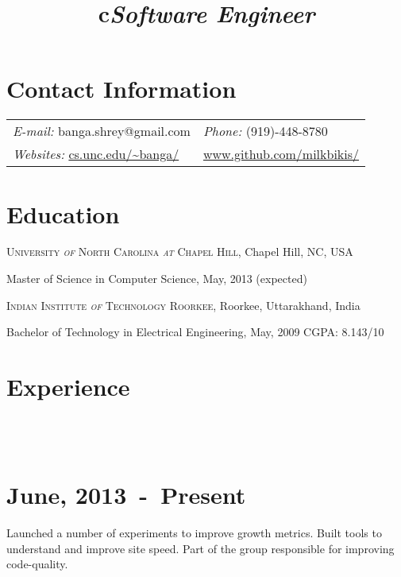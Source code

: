 \documentclass[margin,line]{res}
\newcommand{\datesection}[1]{\section{\textnormal{\scriptsize \textcolor{subtle}{#1}}}}
\newenvironment{list1}{
  \begin{list}{\ding{113}}{%
      \setlength{\itemsep}{0in}
      \setlength{\parsep}{0in} \setlength{\parskip}{0in}
      \setlength{\topsep}{0in} \setlength{\partopsep}{0in} 
      \setlength{\leftmargin}{0.17in}}}{\end{list}}
\begin{document}

\begin{resume}
\section{\sc Contact Information}
\vspace{.05in}
\begin{tabular}{@{}p{2in}p{4in}}
{\it E-mail:}  banga.shrey@gmail.com  & {\it Phone:}  (919)-448-8780 \\            
{\it Websites:} \url{cs.unc.edu/~banga/} & \url{www.github.com/milkbikis/} \\
\end{tabular}

\section{\sc Education}
\textsc{University \textit{of} North Carolina \textit{at} Chapel Hill}, Chapel Hill, NC, USA\\
\vspace*{-.1in}
\begin{list1}
\item[] Master of Science in Computer Science, May, 2013 (expected)
\end{list1}

\textsc{Indian Institute \textit{of} Technology Roorkee}, Roorkee, Uttarakhand, India\\
\vspace*{-.1in}
\begin{list1}
\item[] Bachelor of Technology in Electrical Engineering, May, 2009 \hfill {CGPA: 8.143/10}
\end{list1}

\section{\sc Experience}

\begin{format}
		\title{c}\\
		\body\\
\end{format}

\datesection{June, 2013~-~Present}
\title{\em Software Engineer}
\begin{position}
Launched a number of experiments to improve growth metrics.
Built tools to understand and improve site speed.
Part of the group responsible for improving code-quality.
\end{position}


\end{resume}
\end{document}

